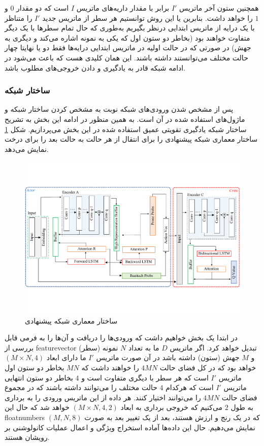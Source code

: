 همچنین ستون آخر ماتریس $I'$ برابر با مقدار داریه‌های ماتریس $I$ است که دو مقدار $0$ و $1$ را خواهد داشت. بنابرین یا این روش توانستیم هر سطر از ماتریس جدید $I'$ را متناظر با یک درایه از ماتریس ابتدایی درنظر بگیریم به‌طوری که حال تمام سطرها با یک دیگر متفاوت خواهند بود (بخاطر دو ستون اول که یکی به نمونه اشاره می‌کند و دیگری به جهش) در صورتی که در حالت اولیه در ماتریس ابتدایی درایه‌ها فقط دو یا نهایتا چهار حالت مختلف می‌توانستند داشته باشند. این همان کلیدی هست که باعث می‌شود در ادامه شبکه قادر به یادگیری و دادن خروجی‌های مطلوب باشد.

\subsubsection{ساختار شبکه}
\label{sec:ch_pm:network}
پس از مشخص شدن ورودی‌های شبکه نوبت به مشخص کردن ساختار شبکه و ماژول‌های استفاده شده در آن است. به همین منظور در ادامه این بخش به تشریح ساختار شبکه یادگیری تقویتی عمیق استفاده شده در این بخش می‌پردازیم.
شکل \ref{fig:ch_pm:main_network} ساختار معماری شبکه پیشنهادی را برای انتقال از هر حالت به حالت بعد را برای درخت نمایش می‌دهد.
\\
\begin{figure}[!ht]
	\centering 
	\includegraphics[width=1.002\textwidth]{img/chaps/pm/network}
	\caption{ساختار معماری شبکه پیشنهادی}    
	\label{fig:ch_pm:main_network}
\end{figure}
در ابتدا یک بخش  خواهیم داشت که ورودی‌ها را دریافت و آن‌ها را به فرمی قابل بررسی از \gls{featurevector} تبدیل خواهد کرد.
اگر ماتریس $D$ ما به تعداد $N$ نمونه (سطر) و $M$ جهش (ستون) داشته باشد در آن صورت ماتریس $I'$ ما دارای ابعاد $(M\times N, 4)$ خواهد بود که در کل فضای حالت $4MN$ را خواهند داشت که $MN$ بخاطر دو ستون اول ماتریس $I'$ است که هر سطر با دیگری متفاوت است و $4$ بخاطر دو ستون انتهایی ماتریس $I'$ است که هرکدام $4$ حالت مختلف را می‌توانند داشته باشند که در مجموع فضای حالت $4MN$ را می‌توانند اختیار کنند. هر داده از این ماتریس ورودی را به برداری به طول $2$  می‌کنیم که خروجی برداری به ابعاد $(M\times N, 4, 2)$ خواهد شد که حال این  \glspl{floatnumber} که در یک رنج و ارزش هستند، بعد از یک تغییر بعد به صورت $(M, N, 8)$ نمایش می‌دهیم. حال این داده‌ها آماده استخراج ویژگی و اعمال عملیات کانولوشنی بر رویشان هستند. 
